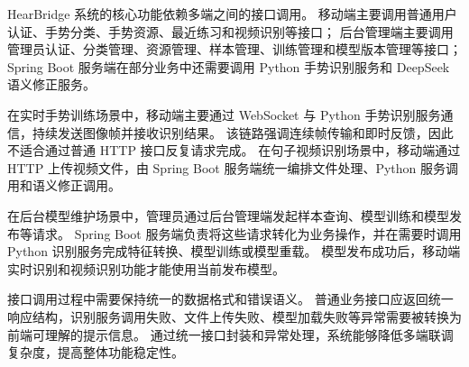HearBridge 系统的核心功能依赖多端之间的接口调用。
移动端主要调用普通用户认证、手势分类、手势资源、最近练习和视频识别等接口；
后台管理端主要调用管理员认证、分类管理、资源管理、样本管理、训练管理和模型版本管理等接口；
Spring Boot 服务端在部分业务中还需要调用 Python 手势识别服务和 DeepSeek 语义修正服务。

在实时手势训练场景中，移动端主要通过 WebSocket 与 Python 手势识别服务通信，持续发送图像帧并接收识别结果。
该链路强调连续帧传输和即时反馈，因此不适合通过普通 HTTP 接口反复请求完成。
在句子视频识别场景中，移动端通过 HTTP 上传视频文件，由 Spring Boot 服务端统一编排文件处理、Python 服务调用和语义修正调用。

在后台模型维护场景中，管理员通过后台管理端发起样本查询、模型训练和模型发布等请求。
Spring Boot 服务端负责将这些请求转化为业务操作，并在需要时调用 Python 识别服务完成特征转换、模型训练或模型重载。
模型发布成功后，移动端实时识别和视频识别功能才能使用当前发布模型。

接口调用过程中需要保持统一的数据格式和错误语义。
普通业务接口应返回统一响应结构，识别服务调用失败、文件上传失败、模型加载失败等异常需要被转换为前端可理解的提示信息。
通过统一接口封装和异常处理，系统能够降低多端联调复杂度，提高整体功能稳定性。
